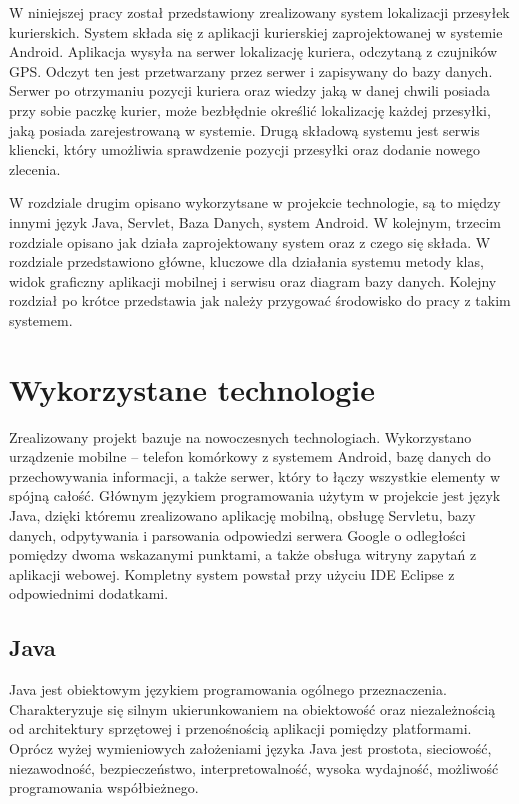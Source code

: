 \documentclass[eng,printmode,oneside]{mgr}
\begin{document}
W niniejszej pracy został przedstawiony zrealizowany system lokalizacji
przesyłek kurierskich. System składa się z aplikacji kurierskiej
zaprojektowanej w systemie Android. Aplikacja wysyła na serwer lokalizację
kuriera, odczytaną z czujników GPS. Odczyt ten jest przetwarzany przez serwer i
zapisywany do bazy danych. Serwer po otrzymaniu pozycji kuriera oraz wiedzy jaką
w danej chwili posiada przy sobie paczkę kurier, może bezbłędnie określić
lokalizację każdej przesyłki, jaką posiada zarejestrowaną w systemie.
Drugą składową systemu jest serwis kliencki, który umożliwia sprawdzenie pozycji
przesyłki oraz dodanie nowego zlecenia.

W rozdziale drugim opisano wykorzytsane w projekcie technologie, są to między
innymi język Java, Servlet, Baza Danych, system Android. W kolejnym, trzecim
rozdziale opisano jak działa zaprojektowany system oraz z czego się składa.
W rozdziale przedstawiono główne, kluczowe dla działania systemu metody klas,
widok graficzny aplikacji mobilnej i serwisu oraz diagram bazy danych.
Kolejny rozdział po krótce przedstawia jak należy przygować środowisko do pracy z takim systemem.

\chapter{Wykorzystane technologie}

Zrealizowany projekt bazuje na nowoczesnych technologiach.
Wykorzystano urządzenie mobilne -- telefon komórkowy z systemem
Android, bazę danych do przechowywania informacji, a także serwer, który to
łączy wszystkie elementy w spójną całość. Głównym językiem
programowania użytym w projekcie jest język Java, dzięki któremu
zrealizowano aplikację mobilną, obsługę Servletu, bazy danych, odpytywania i
parsowania odpowiedzi serwera Google o odległości pomiędzy dwoma wskazanymi
punktami, a także obsługa witryny zapytań z aplikacji webowej. Kompletny system
powstał przy użyciu IDE Eclipse z odpowiednimi dodatkami.

\section{Java}

Java jest obiektowym językiem programowania ogólnego przeznaczenia.
Charakteryzuje się silnym ukierunkowaniem na obiektowość oraz niezależnością od
architektury sprzętowej i przenośnością aplikacji pomiędzy platformami.
Oprócz wyżej wymieniowych założeniami języka Java jest prostota, sieciowość,
niezawodność, bezpieczeństwo, interpretowalność, wysoka wydajność, możliwość
programowania współbieżnego.
\end{document}
